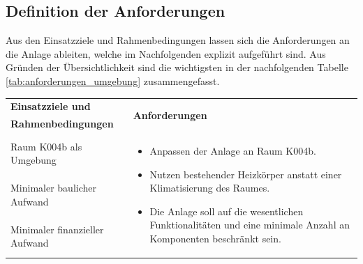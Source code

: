 \subsection{Definition der Anforderungen}

Aus den Einsatzziele und Rahmenbedingungen lassen sich die Anforderungen an die Anlage ableiten, welche im Nachfolgenden explizit aufgeführt sind. Aus Gründen der Übersichtlichkeit sind die wichtigsten in der nachfolgenden Tabelle \ref{tab:anforderungen_umgebung} zusammengefasst.


\begin{table}[H]
\centering
\small
\renewcommand{\arraystretch}{1.3}
\begin{tabularx}{1\textwidth}{m{}m{}}

\toprule

\textbf{Einsatzziele und} & \multirow{2}{\hsize}{\textbf{Anforderungen}} \\ 
\textbf{Rahmenbedingungen} & \\

\cmidrule[0.5pt](r{0.25em}){1-1} 
\cmidrule[0.5pt](l{0.25em}){2-2}

\addlinespace[1mm]
Raum K004b als Umgebung  & \multirow{3}{\hsize}{
\begin{minipage}[t]{0.57\textwidth}
\begin{itemize}[itemsep=0pt,topsep=0pt,leftmargin=5mm]
	\item Anpassen der Anlage an Raum K004b.
	\item Nutzen bestehender Heizkörper anstatt einer Klimatisierung des Raumes. 
	\item Die Anlage soll auf die wesentlichen Funktionalitäten und eine minimale Anzahl an Komponenten beschränkt sein. 
\end{itemize}
\end{minipage}
}
 \\
	
\cmidrule[0.1pt](lr{2em}){1-1} 
\addlinespace[1mm] Minimaler baulicher Aufwand & \\

\cmidrule[0.1pt](lr{2em}){1-1} 
\addlinespace[1mm] Minimaler finanzieller \newline Aufwand &\\ 



\cmidrule[0.5pt](r{0.25em}){1-1} 
\cmidrule[0.5pt](l{0.25em}){2-2}


\end{tabularx}
\end{table}
